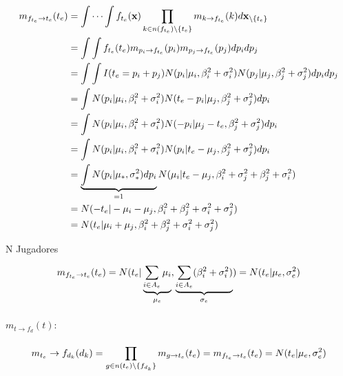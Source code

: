 \documentclass[11pt,twoside, spanish]{report} %
\begin{document}
\begin{equation}
	\centering
	\begin{split}
		m_{f_{t_e}\rightarrow t_e}(t_e) & = \int\cdots\int f_{t_e}(\textbf{x})\prod_{k\in n(f_{t_e})\backslash\{t_e\}} m_{k\rightarrow f_{t_e}}(k)d\textbf{x}_{\backslash \{t_e\}} \\
		& = \int\int f_{t_e}(t_e) m_{p_i\rightarrow f_{t_e}}(p_i)m_{p_j\rightarrow f_{t_e}}(p_j)dp_idp_j \\
		& = \int\int I(t_e=p_i+p_j)N(p_i \vert \mu_i,\beta_i^2+\sigma_i^2)N(p_j \vert \mu_j,\beta_j^2+\sigma_j^2)dp_idp_j\\
		& = \int N(p_i \vert \mu_i,\beta_i^2+\sigma_i^2)N(t_e-p_i \vert \mu_j,\beta_j^2+\sigma_j^2)dp_i\\
		& = \int N(p_i \vert \mu_i,\beta_i^2+\sigma_i^2)N(-p_i \vert \mu_j-t_e,\beta_j^2+\sigma_j^2)dp_i\\
		& = \int N(p_i \vert \mu_i,\beta_i^2+\sigma_i^2)N(p_i \vert t_e-\mu_j,\beta_j^2+\sigma_j^2)dp_i\\
		& = \underbrace{\int N(p_i \vert \mu_{\ast},\sigma_{\ast}^2)dp_i}_{=1}N(\mu_i \vert t_e-\mu_j,\beta_i^2+\sigma_j^2+\beta_j^2+\sigma_i^2)\\
		& =N(-t_e \vert -\mu_i-\mu_j,\beta_i^2+\beta_j^2+\sigma_i^2+\sigma_j^2)\\
		& =N(t_e \vert \mu_i+\mu_j,\beta_i^2+\beta_j^2+\sigma_i^2+\sigma_j	^2)\\
	\end{split}
\end{equation}

N Jugadores

\begin{equation}
	\centering
	m_{f_{t_e}\rightarrow t_e}(t_e)  = N(t_e \vert \underbrace{\sum_{i\in A_e}\mu_i}_{ \mu_e},\underbrace{\sum_{i\in A_e}(\beta_i^2+\sigma_i^2)}_{\sigma_e})
	=N(t_e \vert  \mu_e,\sigma_e^2)
\end{equation}

\paragraph{$m_{t\rightarrow f_{d}}(t):$}

\begin{equation}
	\centering
	m_{t_e}\rightarrow f_{d_k}(d_k) = \prod_{g\in n(t_e)\backslash\{f_{d_k}\}} m_{g\rightarrow t_e}(t_e)
	= m_{f_{t_e}\rightarrow t_e}(t_e)
	=  N(t_e \vert  \mu_e,\sigma_e^2)
\end{equation}
\end{document}
